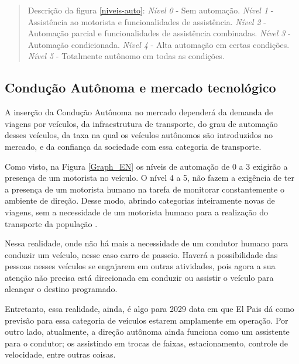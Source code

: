 \begin{quote}
Descrição da figura \ref{niveis-auto}:  \textit{Nível 0} - Sem automação.  \textit{Nível 1} - Assistência ao motorista e funcionalidades de assistência.  \textit{Nível 2} - Automação parcial e funcionalidades de assistência combinadas.  \textit{Nível 3} - Automação condicionada.  \textit{Nível 4} - Alta automação em certas condições.  \textit{Nível 5} - Totalmente autônomo em todas as condições. 
\end{quote}



\subsection{Condução Autônoma e mercado tecnológico}

A inserção da Condução Autônoma no mercado dependerá da demanda de viagens por veículos, da infraestrutura de transporte, do grau de automação desses veículos, da taxa na qual os veículos autônomos são introduzidos no mercado, e da confiança da sociedade com essa categoria de transporte. 

Como visto, na Figura \ref{Graph_EN} os níveis de automação de 0 a 3 exigirão a presença de um motorista no veículo. O nível 4 a 5, não fazem a exigência de ter a presença de um motorista humano na tarefa de monitorar constantemente o ambiente de direção. 
Desse modo, abrindo categorias inteiramente novas de viagens, sem a necessidade de um motorista humano para a realização do transporte da população \cite{notif}.

Nessa realidade, onde não há mais a necessidade de um condutor humano para conduzir um veículo, nesse caso carro de passeio. Haverá a possibilidade das pessoas nesses veículos se engajarem em outras atividades, pois agora a sua atenção não precisa está direcionada em conduzir ou assistir o veículo para alcançar o destino programado. 


Entretanto, essa realidade, ainda, é algo para 2029 \cite{elpais} data em que El Pais dá como previsão para essa categoria de veículos estarem amplamente em operação. Por outro lado, atualmente, a direção autônoma ainda funciona como um assistente para o condutor; os assistindo em trocas de faixas, estacionamento, controle de velocidade, entre outras coisas. 

